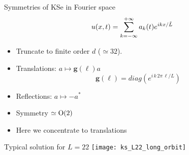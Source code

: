 \begin{frame}{Symmetries of KSe in Fourier space}
\[
    u(x,t)=\sum_{k=-\infty}^{+\infty} a_k (t) e^{ i k x /\tilde{L} }
\]
\begin{itemize}
  \item Truncate to finite order $d$ ($\simeq32$).
  \item Translations: $a\mapsto \mathbf{g}(\ell)a$
    \[
      \mathbf{g}(\ell)= diag(e^{i\,k\,2\pi\,\ell/L})
    \]
  \item Reflections: $a\mapsto -a^*$
  \item Symmetry $\simeq \textrm{O}(2)$
  \item Here we concentrate to translations
%   
\end{itemize}
\end{frame}

\begin{frame}{Typical solution for $L=22$}
  \centering
  \texttt{[image: ks\_L22\_long\_orbit]}

\end{frame}

